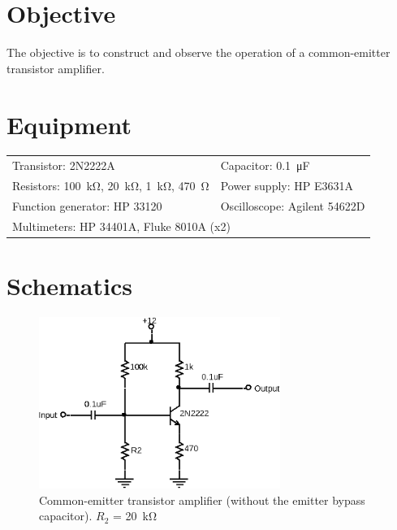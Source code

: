 

\section{Objective}

The objective is to construct and observe the operation of a common-emitter transistor amplifier.

\section{Equipment}

\begin{tabular}{ll}
  \centering
  Transistor: 2N2222A & Capacitor: \SI{0.1}{\micro\farad} \\
  Resistors: \SI{100}{\kilo\ohm}, \SI{20}{\kilo\ohm}, \SI{1}{\kilo\ohm}, \SI{470}{\ohm} & Power supply: HP E3631A \\
  Function generator: HP 33120 & Oscilloscope: Agilent 54622D \\
  \multicolumn{2}{l}{Multimeters: HP 34401A, Fluke 8010A (x2)} \\
\end{tabular}

\section{Schematics}

\begin{figure}[hbtp]
  \centering
  \includegraphics[width=0.7\textwidth]{circuit}
  \caption{\label{fig:circuit} Common-emitter transistor amplifier (without the emitter bypass capacitor). $R_2$ = \SI{20}{\kilo\ohm}}
\end{figure}

